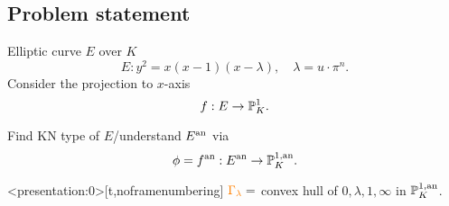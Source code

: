 \subsection{Problem statement} \label{sec:problem_statement}
\begin{frame}
	\begin{minipage}[t]{.7\textwidth}
	Elliptic curve $E$ over $K$
	\[
		E: y^2 = x(x-1)(x-\lambda), \quad \lambda = u\cdot \pi^{n}
	.\] 
	Consider the projection to $x$-axis 
	\[
	f: E \to \mathbb P^{1}_K
	.\] 
	\end{minipage}
	\begin{minipage}[t]{.29\textwidth}
	\end{minipage}

	\pause

	\begin{question}
	Find KN type of $E$/understand $E{}^{\text{an}}$ via \[
	\phi = f{}^{\text{an}} : E{}^{\text{an}} \to \mathbb P^{1, \text{an}}_K
	.\] 
	\end{question}

\end{frame}
\begin{frame}<presentation:0>[t,noframenumbering]
	${\color{orange} \Gamma_\lambda} = $ convex hull of $0, \lambda, 1, \infty$ in $\mathbb P^{1, \text{an}}_K$.
\begin{figure}[ht]
    \centering
\end{figure}
\end{frame}



